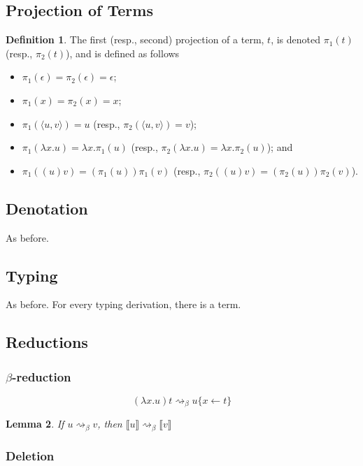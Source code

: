 \documentclass[11pt,a4paper]{article}
\theoremstyle{definition}
\newtheorem{definition}{Definition}
\theoremstyle{plain}
\newtheorem{lemma}[definition]{Lemma}
\theoremstyle{remark}
\begin{document}
\subsection{Projection of Terms}

\begin{definition}
The first (resp., second) projection of a term, $t$, is denoted $\pi_1(t)$ (resp., $\pi_2(t)$), and is defined as follows
\begin{itemize}
	\item $\pi_1(\epsilon)=\pi_2(\epsilon)=\epsilon$;
	\item $\pi_1(x)=\pi_2(x)=x$;
	\item $\pi_1(\langle u,v\rangle)=u$ (resp., $\pi_2(\langle u,v\rangle)=v$);
	\item $\pi_1(\lambda x.u)=\lambda x.\pi_1(u)$ (resp., $\pi_2(\lambda x.u)=\lambda x.\pi_2(u)$); and
	\item $\pi_1( (u)v)=(\pi_1(u))\pi_1(v)$ (resp., $\pi_2( (u)v)=(\pi_2(u))\pi_2(v)$).
\end{itemize}
\end{definition}

\subsection{Denotation}

As before.

\subsection{Typing}

As before. For every typing derivation, there is a term.

\subsection{Reductions}

\subsubsection{$\beta$-reduction}

\[
(\lambda x.u)t \rightsquigarrow_\beta u\{x\leftarrow t\}
\]


\begin{lemma}
	If $u\rightsquigarrow_\beta v$, then $\llbracket u\rrbracket \rightsquigarrow_\beta\llbracket v\rrbracket$
\end{lemma}

\subsubsection{Deletion}
\end{document}
